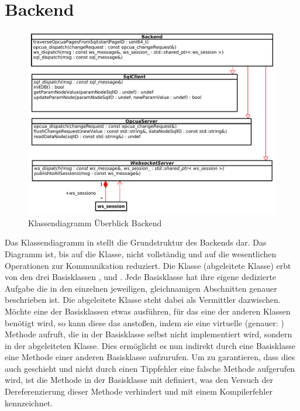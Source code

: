 \section{Backend}\label{sec:poc:backend}
\begin{figure}[ht]
  \centering
  \includegraphics[width=\textwidth]{content/hauptteil/umsetzungPoC/backend/uml/overview.pdf}
  \caption{Klassendiagramm Überblick Backend}
  \label{fig:backend:classDiag:overview}
\end{figure}
Das Klassendiagramm in  stellt die Grundstruktur des Backends dar. 
Das Diagramm ist, bis auf die  Klasse, nicht vollständig und auf die wesentlichen Operationen zur Kommunikation reduziert. 
Die  Klasse (abgeleitete Klasse) erbt von den drei Basisklassen ,  und .
Jede Basisklasse hat ihre eigene dedizierte Aufgabe die in den einzelnen jeweiligen, gleichnamigen Abschnitten genauer beschrieben ist.
Die abgeleitete Klasse steht dabei als Vermittler dazwischen. Möchte eine der Basisklassen etwas ausführen, für das eine der anderen Klassen benötigt wird, 
so kann diese das anstoßen, indem sie eine virtuelle (genauer: ) Methode aufruft, die in der Basisklasse selbst nicht implementiert wird, sondern in der abgeleiteten  Klasse.
Dies ermöglicht es nun indirekt durch eine Basisklasse eine Methode einer anderen Basisklasse aufzurufen.
Um zu garantieren, dass dies auch geschieht und nicht durch einen Tippfehler eine falsche Methode aufgerufen wird, 
ist die Methode in der Basisklasse mit  definiert, was den Versuch der Dereferenzierung dieser Methode verhindert und mit einem Kompilerfehler kennzeichnet.
